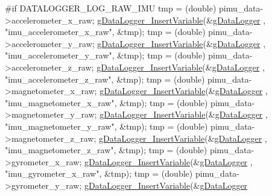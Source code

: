\begin{DoxyCode}
\textcolor{preprocessor}{    #if DATALOGGER\_LOG\_RAW\_IMU}
\textcolor{preprocessor}{}    tmp = (double) pimu\_data->accelerometer\_x\_raw;
    \hyperlink{gdatalogger_8c_a32674e7c2afa8b78e99a0070cf4bcaf9}{gDataLogger\_InsertVariable}(&\hyperlink{datalogger_01_07Caio-PC's_01conflicted_01copy_012012-11-23_08_8c_abe3b9c2c4e21e79c7b046b5986d13acc}{gDataLogger}
      , \textcolor{stringliteral}{"imu\_accelerometer\_x\_raw"}, &tmp);
    tmp = (double) pimu\_data->accelerometer\_y\_raw;
    \hyperlink{gdatalogger_8c_a32674e7c2afa8b78e99a0070cf4bcaf9}{gDataLogger\_InsertVariable}(&\hyperlink{datalogger_01_07Caio-PC's_01conflicted_01copy_012012-11-23_08_8c_abe3b9c2c4e21e79c7b046b5986d13acc}{gDataLogger}
      , \textcolor{stringliteral}{"imu\_accelerometer\_y\_raw"}, &tmp);
    tmp = (double) pimu\_data->accelerometer\_z\_raw;
    \hyperlink{gdatalogger_8c_a32674e7c2afa8b78e99a0070cf4bcaf9}{gDataLogger\_InsertVariable}(&\hyperlink{datalogger_01_07Caio-PC's_01conflicted_01copy_012012-11-23_08_8c_abe3b9c2c4e21e79c7b046b5986d13acc}{gDataLogger}
      , \textcolor{stringliteral}{"imu\_accelerometer\_z\_raw"}, &tmp);
    tmp = (double) pimu\_data->magnetometer\_x\_raw;
    \hyperlink{gdatalogger_8c_a32674e7c2afa8b78e99a0070cf4bcaf9}{gDataLogger\_InsertVariable}(&\hyperlink{datalogger_01_07Caio-PC's_01conflicted_01copy_012012-11-23_08_8c_abe3b9c2c4e21e79c7b046b5986d13acc}{gDataLogger}
      , \textcolor{stringliteral}{"imu\_magnetometer\_x\_raw"}, &tmp);
    tmp = (double) pimu\_data->magnetometer\_y\_raw;
    \hyperlink{gdatalogger_8c_a32674e7c2afa8b78e99a0070cf4bcaf9}{gDataLogger\_InsertVariable}(&\hyperlink{datalogger_01_07Caio-PC's_01conflicted_01copy_012012-11-23_08_8c_abe3b9c2c4e21e79c7b046b5986d13acc}{gDataLogger}
      , \textcolor{stringliteral}{"imu\_magnetometer\_y\_raw"}, &tmp);
    tmp = (double) pimu\_data->magnetometer\_z\_raw;
    \hyperlink{gdatalogger_8c_a32674e7c2afa8b78e99a0070cf4bcaf9}{gDataLogger\_InsertVariable}(&\hyperlink{datalogger_01_07Caio-PC's_01conflicted_01copy_012012-11-23_08_8c_abe3b9c2c4e21e79c7b046b5986d13acc}{gDataLogger}
      , \textcolor{stringliteral}{"imu\_magnetometer\_z\_raw"}, &tmp);
    tmp = (double) pimu\_data->gyrometer\_x\_raw;
    \hyperlink{gdatalogger_8c_a32674e7c2afa8b78e99a0070cf4bcaf9}{gDataLogger\_InsertVariable}(&\hyperlink{datalogger_01_07Caio-PC's_01conflicted_01copy_012012-11-23_08_8c_abe3b9c2c4e21e79c7b046b5986d13acc}{gDataLogger}
      , \textcolor{stringliteral}{"imu\_gyrometer\_x\_raw"}, &tmp);
    tmp = (double) pimu\_data->gyrometer\_y\_raw;
    \hyperlink{gdatalogger_8c_a32674e7c2afa8b78e99a0070cf4bcaf9}{gDataLogger\_InsertVariable}(&\hyperlink{datalogger_01_07Caio-PC's_01conflicted_01copy_012012-11-23_08_8c_abe3b9c2c4e21e79c7b046b5986d13acc}{gDataLogger}

\end{DoxyCode}
